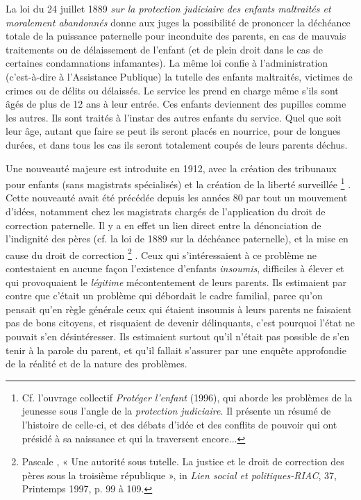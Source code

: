 { La loi du 24 juillet 1889 {\emph{sur la protection judiciaire des enfants maltraités et moralement abandonnés}} donne aux juges la possibilité de prononcer la déchéance totale de la puissance paternelle pour inconduite des parents, en cas de mauvais traitements ou de délaissement de l'enfant (et de plein droit dans le cas de certaines condamnations infamantes). La même loi confie à l'administration (c'est-à-dire à l'Assistance Publique) la tutelle des enfants maltraités, victimes de crimes ou de délits ou délaissés. Le service les prend en charge même s'ils sont âgés de plus de 12 ans à leur entrée. Ces enfants deviennent des pupilles comme les autres. Ils sont traités à l'instar des autres enfants du service. Quel que soit leur âge, autant que faire se peut ils seront placés en nourrice, pour de longues durées, et dans tous les cas ils seront totalement coupés de leurs parents déchus.

 Une nouveauté majeure est introduite en 1912, avec la création des tribunaux pour enfants (sans magistrats spécialisés) et la création de la liberté surveillée%
\footnote{Cf. l'ouvrage collectif \emph{Protéger l'enfant} (1996), qui aborde les problèmes de la jeunesse sous l'angle de la \emph{protection judiciaire}. Il présente un résumé de l'histoire de celle-ci, et des débats d'idée et des conflits de pouvoir qui ont présidé à sa naissance et qui la traversent encore...}%
. Cette nouveauté avait été précédée depuis les années 80 par tout un mouvement d'idées, notamment chez les magistrats chargés de l'application du droit de correction paternelle. Il y a en effet un lien direct entre la dénonciation de l'indignité des pères (cf. la loi de 1889 sur la déchéance paternelle), et la mise en cause du droit de correction%
\footnote{Pascale , « Une autorité sous tutelle. La justice et le droit de correction des pères sous la troisième république », in \emph{Lien social et politiques-RIAC}, 37, Printemps 1997, p. 99 à 109.}%
. Ceux qui s'intéressaient à ce problème ne contestaient en aucune façon l'existence d'enfants \emph{insoumis}, difficiles à élever et qui provoquaient le \emph{légitime} mécontentement de leurs parents. Ils estimaient par contre que c'était un problème qui débordait le cadre familial, parce qu'on pensait qu'en règle générale ceux qui étaient insoumis à leurs parents ne faisaient pas de bons citoyens, et risquaient de devenir délinquants, c'est pourquoi l'état ne pouvait s'en désintéresser. Ils estimaient surtout qu'il n'était pas possible de s'en tenir à la parole du parent, et qu'il fallait s'assurer par une enquête approfondie de la réalité et de la nature des problèmes. 

}
